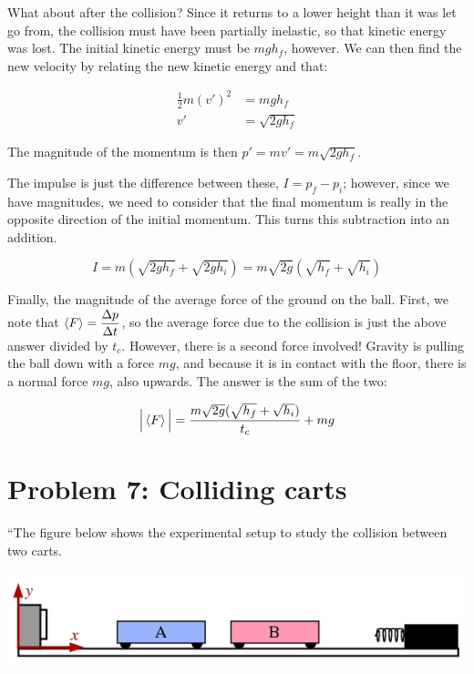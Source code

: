 \documentclass[8.01x]{subfiles}
\begin{document}
What about after the collision? Since it returns to a lower height than it was let go from, the collision must have been partially inelastic, so that kinetic energy was lost. The initial kinetic energy must be $m g h_f$, however. We can then find the new velocity by relating the new kinetic energy and that:

\begin{align}
\frac{1}{2} m (v')^2 &= m g h_f\\
v' &= \sqrt{2 g h_f}
\end{align}

The magnitude of the momentum is then $p' = m v' = m \sqrt{2 g h_f}$.

The impulse is just the difference between these, $I = p_f - p_i$; however, since we have magnitudes, we need to consider that the final momentum is really in the opposite direction of the initial momentum. This turns this subtraction into an addition.

\begin{equation}
I = m(\sqrt{2 g h_f} + \sqrt{2 g h_i}) = m \sqrt{2 g}(\sqrt{h_f} + \sqrt{h_i})
\end{equation}

Finally, the magnitude of the average force of the ground on the ball. First, we note that $\displaystyle \Braket{F} = \frac{\Delta p}{\Delta t}$, so the average force due to the collision is just the above answer divided by $t_c$. However, there is a second force involved! Gravity is pulling the ball down with a force $m g$, and because it is in contact with the floor, there is a normal force $m g$, also upwards. The answer is the sum of the two:

\begin{equation}
\Big|\Braket{F}\Big| = \frac{m \sqrt{2 g}(\sqrt{h_f} + \sqrt{h_i})}{t_c} + m g
\end{equation}

\section{Problem 7: Colliding carts}

``The figure below shows the experimental setup to study the collision between two carts.

\begin{center}
\includegraphics[scale=0.6]{Graphics/h6p7}
\end{center}
\end{document}
